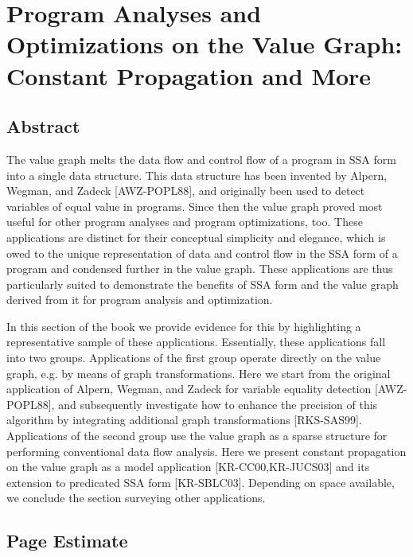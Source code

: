 
\chapter*{Program Analyses and Optimizations on the Value Graph: Constant Propagation and More}


\section{Abstract}

The value graph melts the data flow and control flow of a program in
SSA form into a single data structure. This data structure has been
invented by Alpern, Wegman, and Zadeck [AWZ-POPL88], and originally
been used to detect variables of equal value in programs. Since then
the value graph proved most useful for other program analyses and
program optimizations, too. These applications are distinct for their
conceptual simplicity and elegance, which is owed to the unique
representation of data and control flow in the SSA form of a program
and condensed further in the value graph. These applications are thus
particularly suited to demonstrate the benefits of SSA form and the
value graph derived from it for program analysis and optimization.

In this section of the book we provide evidence for this by
highlighting a representative sample of these
applications. Essentially, these applications fall into two
groups. Applications of the first group operate directly on the value
graph, e.g. by means of graph transformations. Here we start from the
original application of Alpern, Wegman, and Zadeck for variable
equality detection [AWZ-POPL88], and subsequently investigate how to
enhance the precision of this algorithm by integrating additional
graph transformations [RKS-SAS99]. Applications of the second group
use the value graph as a sparse structure for performing conventional
data flow analysis. Here we present constant propagation on the value
graph as a model application [KR-CC00,KR-JUCS03] and its extension to
predicated SSA form [KR-SBLC03]. Depending on space available, we
conclude the section surveying other applications.



\section{Page Estimate}

